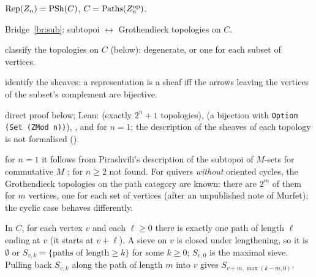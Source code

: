 \begin{trace}
\item[deck] $\mathrm{Rep}(Z_n) = \mathrm{PSh}(C)$, $C = \mathrm{Paths}(Z_n^{\mathrm{op}})$.
\item[arch] Bridge~\ref{br:sub}: subtopoi $\leftrightarrow$ Grothendieck topologies on $C$.
\item[specialise] classify the topologies on $C$ (below): degenerate, or one for each subset of vertices.
\item[unfold] identify the sheaves: a representation is a sheaf iff the arrows leaving the vertices of the subset's complement are bijective.
\item[verify] direct proof below; Lean:  (exactly $2^n+1$ topologies),  (a bijection with \texttt{Option (Set (ZMod n))}), , and  for $n = 1$; the description of the sheaves of each topology is not formalised ().
\item[novelty] for $n = 1$ it follows from Pirashvili's description of the subtopoi of $M$-sets for commutative $M$ \cite[Cor.~4.3.11]{pirashvili-jpaa}; for $n\ge 2$ not found. For quivers \emph{without} oriented cycles, the Grothendieck topologies on the path category are known: there are $2^m$ of them for $m$ vertices, one for each set of vertices \cite[Cor.~4.3]{schmid} (after an unpublished note of Murfet); the cyclic case behaves differently.
\end{trace}

\direct{} In $C$, for each vertex $v$ and each $\ell\ge 0$ there is exactly one path of length $\ell$ ending at $v$ (it starts at $v+\ell$). A sieve on $v$ is closed under lengthening, so it is $\emptyset$ or $S_{v,k} = \{\text{paths of length}\ge k\}$ for some $k\ge 0$; $S_{v,0}$ is the maximal sieve. Pulling back $S_{v,k}$ along the path of length $m$ into $v$ gives $S_{v+m,\max(k-m,0)}$.

